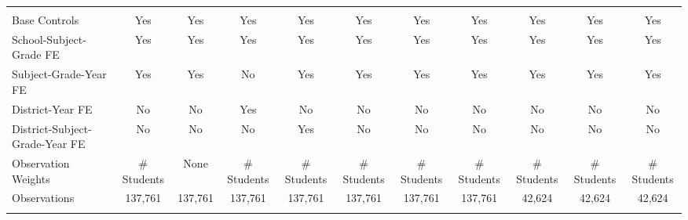 \begin{tabular}{@{\extracolsep{5pt}}lcccccccccc}
\hline \\[-1.8ex] 
Base Controls & Yes & Yes & Yes & Yes & Yes & Yes & Yes & Yes & Yes & Yes \\ 
School-Subject-Grade FE & Yes & Yes & Yes & Yes & Yes & Yes & Yes & Yes & Yes & Yes \\ 
Subject-Grade-Year FE & Yes & Yes & No & Yes & Yes & Yes & Yes & Yes & Yes & Yes \\ 
District-Year FE & No & No & Yes & No & No & No & No & No & No & No \\ 
District-Subject-Grade-Year FE & No & No & No & Yes & No & No & No & No & No & No \\ 
Observation Weights & \# Students & None & \# Students & \# Students & \# Students & \# Students & \# Students & \# Students & \# Students & \# Students \\ 
Observations & 137,761 & 137,761 & 137,761 & 137,761 & 137,761 & 137,761 & 137,761 & 42,624 & 42,624 & 42,624 \\ 
\hline 
\hline \\[-1.8ex] 
\end{tabular} 



